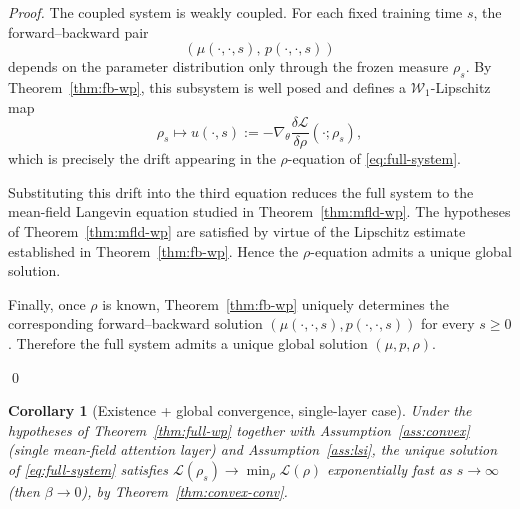 \documentclass[11pt,a4wide]{article}
\newtheorem{corollary}[theorem]{Corollary}
\theoremstyle{definition}
\newcommand{\Wass}{\mathcal{W}}
\begin{document}
\begin{proof}

The coupled system is weakly coupled. For each fixed training
time $s$, the forward--backward pair
\[
(\mu(\cdot,\cdot,s),\,p(\cdot,\cdot,s))
\]
depends on the parameter distribution only through the frozen measure
$\rho_s$. By Theorem~\ref{thm:fb-wp}, this subsystem is well posed and defines
a $\Wass_1$-Lipschitz map
\[
\rho_s
\longmapsto
u(\cdot,s)
:=
-\nabla_\theta
\frac{\delta\mathcal L}{\delta\rho}
(\cdot;\rho_s),
\]
which is precisely the drift appearing in the $\rho$-equation of
\eqref{eq:full-system}.

Substituting this drift into the third equation reduces the full system to the
mean-field Langevin equation studied in
Theorem~\ref{thm:mfld-wp}. The hypotheses of
Theorem~\ref{thm:mfld-wp} are satisfied by virtue of the Lipschitz estimate
established in Theorem~\ref{thm:fb-wp}. Hence the $\rho$-equation admits a
unique global solution.

Finally, once $\rho$ is known, Theorem~\ref{thm:fb-wp} uniquely determines the
corresponding forward--backward solution
$(\mu(\cdot,\cdot,s),p(\cdot,\cdot,s))$ for every $s\ge0$. Therefore the full
system admits a unique global solution $(\mu,p,\rho)$.

\qed
\end{proof}
\iffalse 
\begin{corollary}[Existence + global convergence, single-layer case]
Under the hypotheses of Theorem~\ref{thm:full-wp} together with Assumption~\ref{ass:convex} (single mean-field attention layer) and Assumption~\ref{ass:lsi}, the unique solution of \eqref{eq:full-system} satisfies $\mathcal L(\rho_s)\to\min_\rho\mathcal L(\rho)$ exponentially fast as $s\to\infty$ (then $\beta\to0$), by Theorem~\ref{thm:convex-conv}.
\end{corollary}
\end{document}
